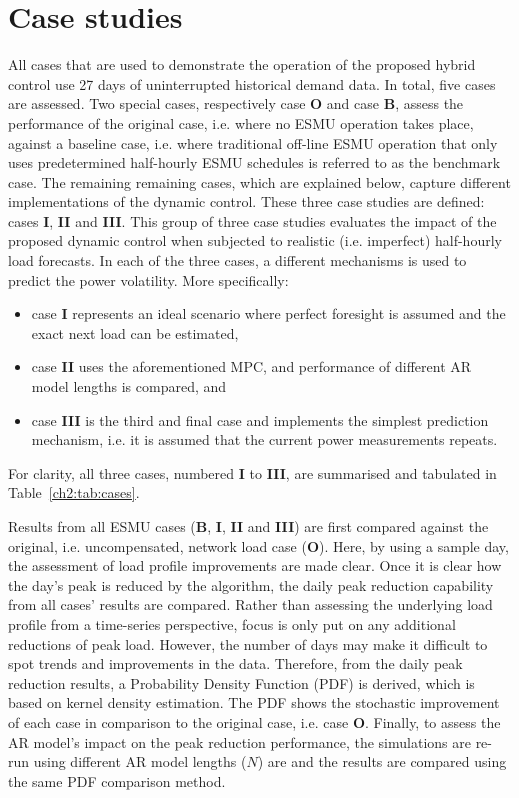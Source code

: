 \section{Case studies}
\label{ch2:sec:case-studies}

All cases that are used to demonstrate the operation of the proposed hybrid control use 27 days of uninterrupted historical demand data.
In total, five cases are assessed.
Two special cases, respectively case \textbf{O} and case \textbf{B}, assess the performance of the original case, i.e. where no ESMU operation takes place, against a baseline case, i.e.  where traditional off-line ESMU operation that only uses predetermined half-hourly ESMU schedules is referred to as the benchmark case.
The remaining remaining cases, which are explained below, capture different implementations of the dynamic control.
These three case studies are defined: cases \textbf{I}, \textbf{II} and \textbf{III}.
This group of three case studies evaluates the impact of the proposed dynamic control when subjected to realistic (i.e. imperfect) half-hourly load forecasts.
In each of the three cases, a different mechanisms is used to predict the power volatility.
More specifically:
\begin{itemize}
	\item case \textbf{I} represents an ideal scenario where perfect foresight is assumed and the exact next load can be estimated,
	\item case \textbf{II} uses the aforementioned MPC, and performance of different AR model lengths is compared, and
	\item case \textbf{III} is the third and final case and implements the simplest prediction mechanism, i.e. it is assumed that the current power measurements repeats.
\end{itemize}
For clarity, all three cases, numbered \textbf{I} to \textbf{III}, are summarised and tabulated in Table~\ref{ch2:tab:cases}.



Results from all ESMU cases (\textbf{B}, \textbf{I}, \textbf{II} and \textbf{III}) are first compared against the original, i.e. uncompensated, network load case (\textbf{O}).
Here, by using a sample day, the assessment of load profile improvements are made clear.
Once it is clear how the day's peak is reduced by the algorithm, the daily peak reduction capability from all cases' results are compared.
Rather than assessing the underlying load profile from a time-series perspective, focus is only put on any additional reductions of peak load.
However, the number of days may make it difficult to spot trends and improvements in the data.
Therefore, from the daily peak reduction results, a Probability Density Function (PDF) is derived, which is based on kernel density estimation.
The PDF shows the stochastic improvement of each case in comparison to the original case, i.e. case \textbf{O}.
Finally, to assess the AR model's impact on the peak reduction performance, the simulations are re-run using different AR model lengths ($N$) are and the results are compared using the same PDF comparison method.
